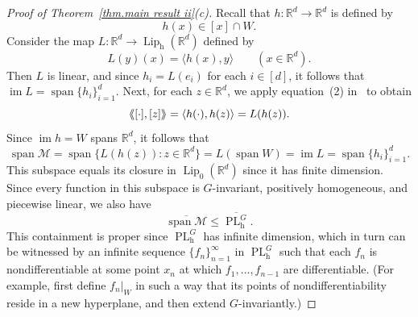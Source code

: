 \documentclass{article}
\theoremstyle{plain}
\theoremstyle{definition}
\newcommand{\llangle}{\langle\hspace{-2.5pt}\langle}
\newcommand{\rrangle}{\rangle\hspace{-2.5pt}\rangle}
\begin{document}
\begin{proof}[Proof of Theorem~\ref{thm.main result ii}(c)]
Recall that $h\colon\mathbb{R}^d\to\mathbb{R}^d$ is defined by
\[
h(x)
\in [x]\cap W.
\]
Consider the map $L\colon\mathbb{R}^d\to\operatorname{Lip}_{\operatorname{h}}(\mathbb{R}^d)$ defined by
\[
L(y)(x)
=\langle h(x),y\rangle
\qquad
(x\in\mathbb{R}^d).
\]
Then $L$ is linear, and since $h_i=L(e_i)$ for each $i\in[d]$, it follows that $\operatorname{im}L=\operatorname{span}\{h_i\}_{i=1}^d$.
Next, for each $z\in\mathbb{R}^d$, we apply equation~(2) in~\cite{MixonP:23} to obtain
\[
\llangle[\cdot],[z]\rrangle
=\langle h(\cdot),h(z)\rangle
=L(h(z)).
\]
Since $\operatorname{im}h=W$ spans $\mathbb{R}^d$, it follows that
\[
\operatorname{span}\mathcal{M}
=\operatorname{span}\{L(h(z)):z\in\mathbb{R}^d\}
=L(\operatorname{span} W)
=\operatorname{im}L
=\operatorname{span}\{h_i\}_{i=1}^d.
\]
This subspace equals its closure in $\operatorname{Lip}_0(\mathbb{R}^d)$ since it has finite dimension.
Since every function in this subspace is $G$-invariant, positively homogeneous, and piecewise linear, we also have
\[
\overline{\operatorname{span}\mathcal{M}}
\leq\overline{\operatorname{PL}_{\operatorname{h}}^G}.
\]
This containment is proper since $\operatorname{PL}_{\operatorname{h}}^G$ has infinite dimension, which in turn can be witnessed by an infinite sequence $\{f_n\}_{n=1}^\infty$ in $\operatorname{PL}_{\operatorname{h}}^G$ such that each $f_n$ is nondifferentiable at some point $x_n$ at which $f_1,\ldots,f_{n-1}$ are differentiable.
(For example, first define $f_n|_W$ in such a way that its points of nondifferentiability reside in a new hyperplane, and then extend $G$-invariantly.)


\end{proof}
\end{document}
